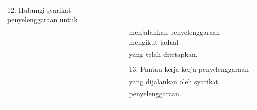 \documentclass[
]{article}
\begin{document}
\begin{longtable}[]{@{}ll@{}}
\begin{minipage}[t]{0.71\columnwidth}
12. Hubungi syarikat penyelenggaraan untuk\strut
\end{minipage}\tabularnewline
\begin{minipage}[t]{0.23\columnwidth}\raggedright
\strut
\end{minipage} & \begin{minipage}[t]{0.71\columnwidth}\raggedright
menjalankan penyelenggaraan mengikut jadual\strut
\end{minipage}\tabularnewline
\begin{minipage}[t]{0.23\columnwidth}\raggedright
\strut
\end{minipage} & \begin{minipage}[t]{0.71\columnwidth}\raggedright
yang telah ditetapkan.\strut
\end{minipage}\tabularnewline
\begin{minipage}[t]{0.23\columnwidth}\raggedright
\strut
\end{minipage} & \begin{minipage}[t]{0.71\columnwidth}\raggedright
\strut
\end{minipage}\tabularnewline
\begin{minipage}[t]{0.23\columnwidth}\raggedright
\strut
\end{minipage} & \begin{minipage}[t]{0.71\columnwidth}\raggedright
13. Pantau kerja-kerja penyelenggaraan\strut
\end{minipage}\tabularnewline
\begin{minipage}[t]{0.23\columnwidth}\raggedright
\strut
\end{minipage} & \begin{minipage}[t]{0.71\columnwidth}\raggedright
yang dijalankan oleh syarikat\strut
\end{minipage}\tabularnewline
\begin{minipage}[t]{0.23\columnwidth}\raggedright
\strut
\end{minipage} & \begin{minipage}[t]{0.71\columnwidth}\raggedright
penyelenggaraan.\strut
\end{minipage}\tabularnewline
\begin{minipage}[t]{0.23\columnwidth}\raggedright
\strut
\end{minipage} & \begin{minipage}[t]{0.71\columnwidth}\raggedright
\strut
\end{minipage}\tabularnewline
\begin{minipage}[t]{0.23\columnwidth}\raggedright

\end{minipage}
\end{longtable}
\end{document}
